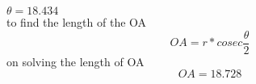 \documentclass[journal,10pt,twocolumn]{article}
\begin{document}
 \vspace{2mm}

\hspace{25mm} $ \theta = 18.434 $\\
to find the length of the OA 
\begin{equation*}
     OA = r*cosec\frac{\theta}{2}
\end{equation*}
on solving the length of OA
\begin{equation*}
    OA = 18.728
\end{equation*}
\end{document}
